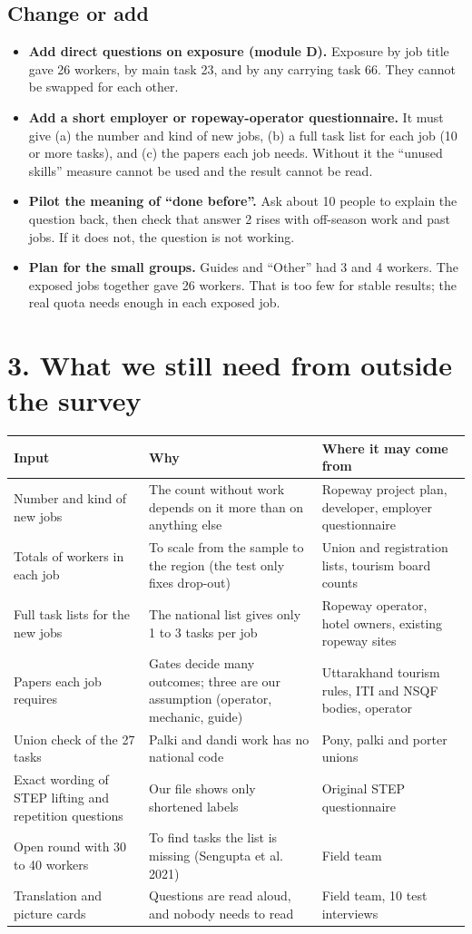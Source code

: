 \documentclass[11pt]{article}
\begin{document}
\subsection*{Change or add}
\begin{itemize}[leftmargin=1.2em,itemsep=2pt]
\item \textbf{Add direct questions on exposure (module D).} Exposure by job title gave 26 workers, by main task 23, and by any carrying task 66. They cannot be swapped for each other.
\item \textbf{Add a short employer or ropeway-operator questionnaire.} It must give (a) the number and kind of new jobs, (b) a full task list for each job (10 or more tasks), and (c) the papers each job needs. Without it the ``unused skills'' measure cannot be used and the result cannot be read.
\item \textbf{Pilot the meaning of ``done before''.} Ask about 10 people to explain the question back, then check that answer 2 rises with off-season work and past jobs. If it does not, the question is not working.
\item \textbf{Plan for the small groups.} Guides and ``Other'' had 3 and 4 workers. The exposed jobs together gave 26 workers. That is too few for stable results; the real quota needs enough in each exposed job.
\end{itemize}

\section*{3. What we still need from outside the survey}
\begin{tabular}{@{}p{4.3cm}p{5.6cm}p{4.5cm}@{}}
\toprule
\textbf{Input} & \textbf{Why} & \textbf{Where it may come from} \\
\midrule
Number and kind of new jobs & The count without work depends on it more than on anything else & Ropeway project plan, developer, employer questionnaire \\
Totals of workers in each job & To scale from the sample to the region (the test only fixes drop-out) & Union and registration lists, tourism board counts \\
Full task lists for the new jobs & The national list gives only 1 to 3 tasks per job & Ropeway operator, hotel owners, existing ropeway sites \\
Papers each job requires & Gates decide many outcomes; three are our assumption (operator, mechanic, guide) & Uttarakhand tourism rules, ITI and NSQF bodies, operator \\
Union check of the 27 tasks & Palki and dandi work has no national code & Pony, palki and porter unions \\
Exact wording of STEP lifting and repetition questions & Our file shows only shortened labels & Original STEP questionnaire \\
Open round with 30 to 40 workers & To find tasks the list is missing (Sengupta et al. 2021) & Field team \\
Translation and picture cards & Questions are read aloud, and nobody needs to read & Field team, 10 test interviews \\
\bottomrule
\end{tabular}
\end{document}
